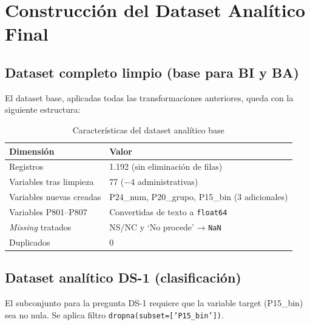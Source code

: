 \documentclass[12pt,a4paper]{article}
\newcommand{\thead}[1]{\cellcolor{tableheader}\color{white}\textbf{#1}}
\begin{document}
\section{Construcción del Dataset Analítico Final}

\subsection{Dataset completo limpio (base para BI y BA)}

El dataset base, aplicadas todas las transformaciones anteriores, queda con la siguiente estructura:

\begin{table}[H]
\centering
\renewcommand{\arraystretch}{1.3}
\begin{tabularx}{\linewidth}{p{3.5cm} X}
\toprule
\thead{Dimensión} & \thead{Valor} \\
\midrule
Registros                  & 1.192 (sin eliminación de filas) \\
\rowcolor{tablerow}
Variables tras limpieza    & 77 ($-$4 administrativas) \\
Variables nuevas creadas   & P24\_num, P20\_grupo, P15\_bin (3 adicionales) \\
\rowcolor{tablerow}
Variables P801--P807       & Convertidas de texto a \texttt{float64} \\
\textit{Missing} tratados  & NS/NC y `No procede' → \texttt{NaN} \\
\rowcolor{tablerow}
Duplicados                 & 0 \\
\bottomrule
\end{tabularx}
\caption{Características del dataset analítico base}
\end{table}

\subsection{Dataset analítico DS-1 (clasificación)}

El subconjunto para la pregunta DS-1 requiere que la variable target (P15\_bin) sea no nula. Se aplica filtro \texttt{dropna(subset=['P15\_bin'])}.
\end{document}
